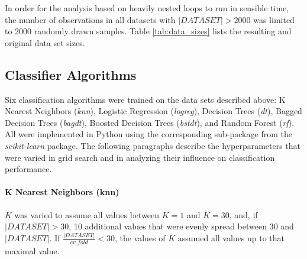 \documentclass[twoside,11pt]{article}
\begin{document}
			\vspace{1em}
			
			In order for the analysis based on heavily nested loops to run in sensible time, the number of observations in all datasets with $|DATASET| > 2000$ was limited to 2000 randomly drawn samples. Table \ref{tab:data_sizes} lists the resulting and original data set sizes.
			
			\begin{table}
			\end{table}
	
		\subsection{Classifier Algorithms}
			\label{sec:clf_hyperparams}
			Six classification algorithms were trained on the data sets described above: K Nearest Neighbors (\textit{knn}), Logistic Regression (\textit{logreg}), Decision Trees (\textit{dt}), Bagged Decision Trees (\textit{bagdt}), Boosted Decision Trees (\textit{bstdt}), and Random Forest (\textit{rf}). All were implemented in Python using the corresponding sub-package from the \textit{scikit-learn} package. The following paragraphs describe the hyperparameters that were varied in grid search and in analyzing their influence on classification performance.
			
			\paragraph{K Nearest Neighbors (knn)}
			$K$ was varied to assume all values between $K=1$ and $K=30$, and, if $|DATASET|>30$, 10 additional values that were evenly spread between 30 and $|DATASET|$. If $\frac{|DATASET|}{cv\_fold} < 30$, the values of $K$ assumed all values up to that maximal value.
			
\end{document}
